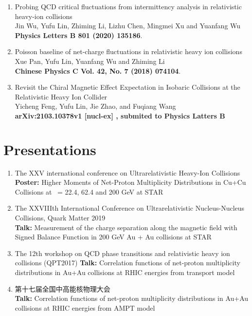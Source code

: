 \begin{enumerate}
\item  Probing QCD critical fluctuations from intermittency analysis in relativistic heavy-ion collisions \\
Jin Wu,  {\color{red}  Yufu Lin}, Zhiming Li,  Lizhu Chen,  Mingmei Xu and Yuanfang Wu\\
\textbf{Physics Letters B 801 (2020) 135186}. \\

\item  Poisson baseline of net-charge fluctuations in relativistic heavy ion collisions \\
Xue Pan,  {\color{red}  Yufu Lin}, Yuanfang Wu and  Zhiming Li\\
\textbf{Chinese Physics C Vol. 42, No. 7 (2018) 074104}.\\



\item Revisit the Chiral Magnetic Effect Expectation in Isobaric Collisions at the Relativistic Heavy Ion Collider\\
 Yicheng Feng,  {\color{red} Yufu Lin}, Jie Zhao, and Fuqiang Wang \\ 
 \textbf{ arXiv:2103.10378v1 [nucl-ex] , submited to Physics Latters B}\\
\end{enumerate}



\section*{Presentations}
\begin{enumerate}
\item The XXV international conference on Ultrarelativistic Heavy-Ion Collisions\\
 \textbf{Poster:} Higher Moments of Net-Proton Multiplicity Distributions in Cu+Cu Collisions at \sNN \, = 22.4, 62.4 and 200 GeV at STAR\\

\item  The XXVIIIth International Conference on Ultrarelativistic Nucleus-Nucleus Collisions, Quark Matter 2019\\
\textbf{Talk: }  Measurement of the charge separation along the magnetic field with Signed Balance Function in 200 GeV Au + Au collisions at STAR


\item    The 12th workshop on QCD phase transitions and relativistic heavy ion collisions (QPT2017)
\textbf{Talk:} Correlation functions of net-proton multiplicity distributions in Au+Au collisions at RHIC energies from transport model

\item  第十七届全国中高能核物理大会  \\
\textbf{Talk:}    Correlation functions of net-proton multiplicity distributions in Au+Au collisions at RHIC energies from AMPT model


\end{enumerate}



